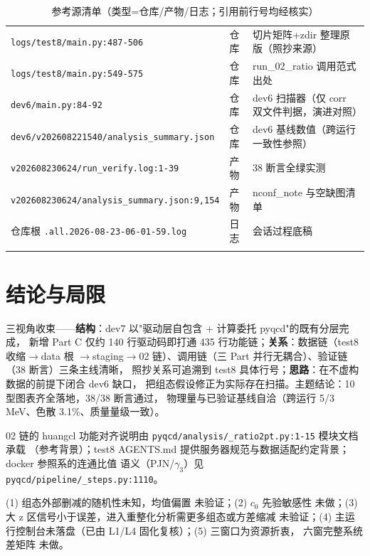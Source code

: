 \documentclass[UTF8]{ctexart}
\begin{document}
\begin{xltabular}{\textwidth}{llX}
\texttt{\nolinkurl{logs/test8/main.py:487-506}} & 仓库 & 切片矩阵+zdir 整理原版（照抄来源） \\
\texttt{\nolinkurl{logs/test8/main.py:549-575}} & 仓库 & run\_02\_ratio 调用范式出处 \\
\texttt{\nolinkurl{dev6/main.py:84-92}} & 仓库 & dev6 扫描器（仅 corr 双文件判据，演进对照） \\
\texttt{\nolinkurl{dev6/v202608221540/analysis\_summary.json}} & 仓库 & dev6 基线数值（跨运行一致性参照） \\
\texttt{\nolinkurl{v202608230624/run\_verify.log:1-39}} & 产物 & 38 断言全绿实测 \\
\texttt{\nolinkurl{v202608230624/analysis\_summary.json:9,154}} & 产物 & nconf\_note 与空缺图清单 \\
仓库根 \texttt{\nolinkurl{.all.2026-08-23-06-01-59.log}} & 日志 & 会话过程底稿 \\
\bottomrule
\caption{参考源清单（类型=仓库/产物/日志；引用前行号均经核实）}
\end{xltabular}

\section{结论与局限}
\begin{conclbox}
三视角收束——\textbf{结构}：dev7 以"驱动层自包含 + 计算委托 pyqcd"的既有分层完成，
新增 Part C 仅约 140 行驱动码即打通 435 行功能链；\textbf{关系}：数据链（test8 收缩$\to$data 根
$\to$staging$\to$02 链）、调用链（三 Part 并行无耦合）、验证链（38 断言）三条主线清晰，
照抄关系可追溯到 test8 具体行号；\textbf{思路}：在不虚构数据的前提下闭合 dev6 缺口，
把组态假设修正为实际存在扫描。主题结论：10 型图表齐全落地，38/38 断言通过，
物理量与已验证基线自洽（跨运行 5/3 MeV、色散 3.1\%、质量量级一致）。
\end{conclbox}
\begin{refbox}
02 链的 huangcl 功能对齐说明由 \texttt{\nolinkurl{pyqcd/analysis/\_ratio2pt.py:1-15}} 模块文档承载
（参考背景）；test8 AGENTS.md 提供服务器规范与数据适配约定背景；docker 参照系的连通比值
语义（PJN/$\gamma_3$）见 \texttt{\nolinkurl{pyqcd/pipeline/\_steps.py:1110}}。
\end{refbox}
\begin{warnbox}
(1) 组态外部删减的随机性未知，均值偏置 \textcolor{warn}{未验证}；(2) $c_0$ 先验敏感性
\textcolor{warn}{未做}；(3) 大 z 区信号小于误差，进入重整化分析需更多组态或方差缩减
\textcolor{warn}{未验证}；(4) 主运行控制台未落盘（已由 L1/L4 固化复核）；(5) 三窗口为资源折衷，
六窗完整系统差矩阵 \textcolor{warn}{未做}。
\end{warnbox}
\end{document}
